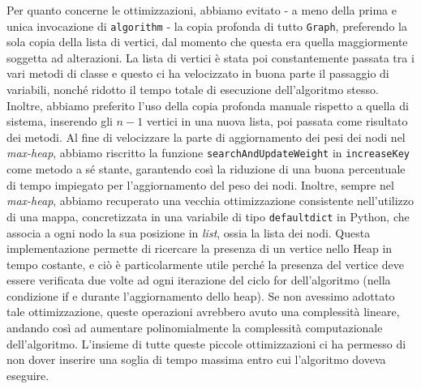 Per quanto concerne le ottimizzazioni, abbiamo evitato - a meno della prima e unica invocazione di \texttt{algorithm} - la copia profonda di tutto \texttt{Graph}, preferendo la sola copia della lista di vertici, dal momento che questa era quella maggiormente soggetta ad alterazioni. La lista di vertici è stata poi constantemente passata tra i vari metodi di classe e questo ci ha velocizzato in buona parte il passaggio di variabili, nonché ridotto il tempo totale di esecuzione dell'algoritmo stesso. Inoltre, abbiamo preferito l'uso della copia profonda manuale rispetto a quella di sistema, inserendo gli \(n-1\) vertici in una nuova lista, poi passata come risultato dei metodi. 
Al fine di velocizzare la parte di aggiornamento dei pesi dei nodi nel \textit{max-heap}, abbiamo riscritto la funzione \texttt{searchAndUpdateWeight} in \texttt{increaseKey} come metodo a sé stante, garantendo così la riduzione di una buona percentuale di tempo impiegato per l'aggiornamento del peso dei nodi. Inoltre, sempre nel \textit{max-heap}, abbiamo recuperato una vecchia ottimizzazione consistente nell'utilizzo di una mappa, concretizzata in una variabile di tipo \texttt{defaultdict} in Python, che associa a ogni nodo la sua posizione in \textit{list}, ossia la lista dei nodi. Questa implementazione permette di ricercare la presenza di un vertice nello Heap in tempo costante, e ciò è particolarmente utile perché la presenza del vertice deve essere verificata due volte ad ogni iterazione del ciclo for dell'algoritmo (nella condizione if e durante l'aggiornamento dello heap). Se non avessimo adottato tale ottimizzazione, queste operazioni avrebbero avuto una complessità lineare, andando così ad aumentare polinomialmente la complessità computazionale dell'algoritmo.
L'insieme di tutte queste piccole ottimizzazioni ci ha permesso di non dover inserire una soglia di tempo massima entro cui l'algoritmo doveva eseguire.